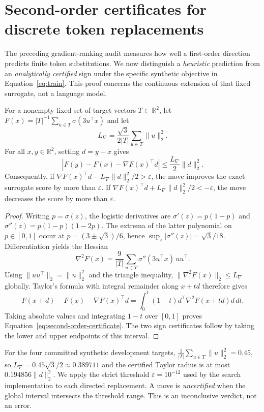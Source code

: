 \section{Second-order certificates for discrete token replacements}
\label{sec:taylor-certificates}
The preceding gradient-ranking audit measures how well a first-order
direction predicts finite token substitutions. We now distinguish a
\emph{heuristic} prediction from an \emph{analytically certified} sign
under the specific synthetic objective in Equation~\eqref{eq:train}.
This proof concerns the continuous extension of that fixed surrogate,
not a language model.

\begin{proposition}
\label{prop:taylor-certificate}
For a nonempty fixed set of target vectors $T\subset\mathbb R^2$, let
$F(x)=|T|^{-1}\sum_{u\in T}\sigma(3u^\top x)$ and let
\[
L_{\nabla}=\frac{\sqrt{3}}{2|T|}\sum_{u\in T}\|u\|_2^2.
\]
For all $x,y\in\mathbb R^2$, setting $d=y-x$ gives
\begin{equation}
\left|F(y)-F(x)-\nabla F(x)^\top d\right|
 \leq \frac{L_{\nabla}}{2}\|d\|_2^2.
\label{eq:second-order-certificate}
\end{equation}
Consequently, if $\nabla F(x)^\top d-
L_{\nabla}\|d\|_2^2/2>\varepsilon$, the move improves
the exact surrogate score by more than $\varepsilon$.
If $\nabla F(x)^\top d+
L_{\nabla}\|d\|_2^2/2<-\varepsilon$, the move decreases
the score by more than $\varepsilon$.
\end{proposition}
\begin{proof}
Writing $p=\sigma(z)$, the logistic derivatives are
$\sigma'(z)=p(1-p)$ and
$\sigma''(z)=p(1-p)(1-2p)$.
The extrema of the latter polynomial on $p\in[0,1]$
occur at $p=(3\pm\sqrt{3})/6$, hence
$\sup_z|\sigma''(z)|=\sqrt{3}/18$.
Differentiation yields the Hessian
\[
\nabla^2 F(x)=\frac9{|T|}\sum_{u\in T}
                  \sigma''(3u^\top x)\,uu^\top.
\]
Using $\|uu^\top\|_2=\|u\|_2^2$ and the triangle inequality,
$\|\nabla^2F(x)\|_2\le L_{\nabla}$ globally.
Taylor's formula with integral remainder along
$x+td$ therefore gives
\[
F(x+d)-F(x)-\nabla F(x)^\top d
=\int_0^1(1-t)d^\top\nabla^2 F(x+td)d\,dt.
\]
Taking absolute values and integrating $1-t$ over $[0,1]$
proves Equation~\eqref{eq:second-order-certificate}.
The two sign certificates follow by taking the lower and
upper endpoints of this interval.
\end{proof}

For the four committed synthetic development targets,
$\frac1{|T|}\sum_{u\in T}\|u\|_2^2=0.45$,
so $L_{\nabla}=0.45\sqrt{3}/2\approx0.389711$ and
the certified Taylor radius is at most
$0.194856\|d\|_2^2$.
We apply the strict threshold $\varepsilon=10^{-12}$
used by the search implementation to each directed replacement.
A move is \emph{uncertified} when the global interval intersects
the threshold range. This is an inconclusive verdict, not an error.

